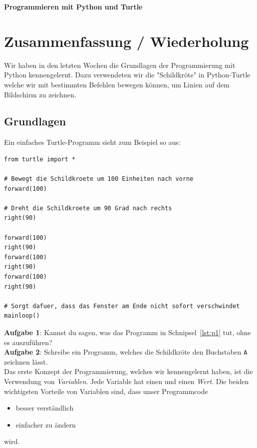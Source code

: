 \documentclass[ngerman,11pt]{article}
\begin{document}
    \setlength{\parindent}{0}

    {\huge \textbf{Programmieren mit Python und Turtle}}

    \vspace{1cm}


    \section{Zusammenfassung / Wiederholung}

    Wir haben in den letzten Wochen die Grundlagen der Programmierung mit Python kennengelernt.
    Dazu verwendeten wir die "Schildkröte" in Python-Turtle welche wir mit bestimmten
    Befehlen bewegen können, um Linien auf dem Bildschirm zu zeichnen. \\

    \subsection{Grundlagen}

    Ein einfaches Turtle-Programm sieht zum Beispiel so aus: \\

    \begin{lstlisting}[caption=Simples Muster,label={lst:p1}]
from turtle import *

# Bewegt die Schildkroete um 100 Einheiten nach vorne
forward(100)

# Dreht die Schildkroete um 90 Grad nach rechts
right(90)

forward(100)
right(90)
forward(100)
right(90)
forward(100)
right(90)

# Sorgt dafuer, dass das Fenster am Ende nicht sofort verschwindet
mainloop()
    \end{lstlisting}

    \textbf{Aufgabe 1}: Kannst du sagen, was das Programm in Schnipsel~\ref{lst:p1} tut, ohne es auszuführen? \\

    \textbf{Aufgabe 2}: Schreibe ein Programm, welches die Schildkröte den Buchstaben \lstinline{A} zeichnen lässt. \\

    Das erste Konzept der Programmierung, welches wir kennengelernt haben, ist die Verwendung
    von \textit{Variablen}.
    Jede Variable hat einen  und einen \textit{Wert}.
    Die beiden wichtigsten Vorteile von Variablen sind, dass unser Programmcode
    \begin{itemize}
        \item besser verständlich
        \item einfacher zu ändern
    \end{itemize}
    wird. \\
\end{document}
